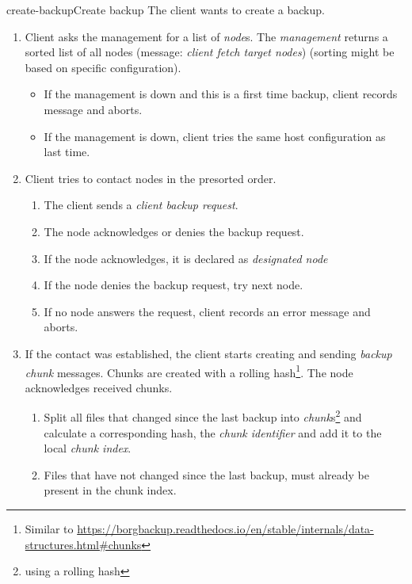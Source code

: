 \begin{scenario}{create-backup}{Create backup}
    The client wants to create a backup.
    
    \begin{enumerate}
    	\item Client asks the management for a list of \emph{node}s. The \emph{management} returns a sorted list of all nodes (message: \emph{client fetch target nodes}) (sorting might be based on specific configuration).
    		\begin{itemize}
    			\item If the management is down and this is a first time backup, client records message and aborts.
   				\item If the management is down, client tries the same host configuration as last time.
   			\end{itemize}
   		\item Client tries to contact nodes in the presorted order.
   			\begin{enumerate}
   				\item The client sends a \emph{client backup request}. %
   				\item The node acknowledges or denies the backup request.
   				\item If the node acknowledges, it is declared as \emph{designated node}
   				\item If the node denies the backup request, try next node.
   				\item If no node answers the request, client records an error message and aborts.
   			\end{enumerate}
   		\item If the contact was established, the client starts creating and sending \emph{backup chunk} messages. Chunks are created with a rolling hash\footnote{Similar to \url{https://borgbackup.readthedocs.io/en/stable/internals/data-structures.html\#chunks}}. The node acknowledges received chunks.
   			\begin{enumerate}
   				\item Split all files that changed since the last backup into \emph{chunk}s\footnote{using a rolling hash} and calculate a corresponding hash, the \emph{chunk identifier} and add it to the local \emph{chunk index}.
   				\item Files that have not changed since the last backup, must already be present in the chunk index.

\end{enumerate}
\end{enumerate}
\end{scenario}
